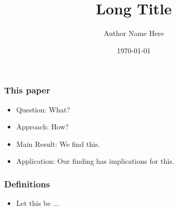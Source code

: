 \newcommand*{\MyHeaderPath}{.}%
\newcommand*{\PathToAssets}{../assets}%
\newcommand*{\PathToOutput}{../output}%






\title[Short Title]{
Long Title
}
\author[Short Author Name]{Author Name Here}
\date{\today}



\begin{frame}
\titlepage
\end{frame}

\begin{frame}
  \frametitle{This paper} %
  \begin{itemize}
  \item \alert{Question:} 
  What?
  \item \alert{Approach:} 
  How?
  \item \alert{Main Result:} 
  We find this.
  \item \alert{Application:}
  Our finding has implications for this.
  \end{itemize}
\end{frame}


\begin{frame}
\frametitle{Definitions}
\begin{itemize}
\item Let this be ...
\end{itemize}
\end{frame}

